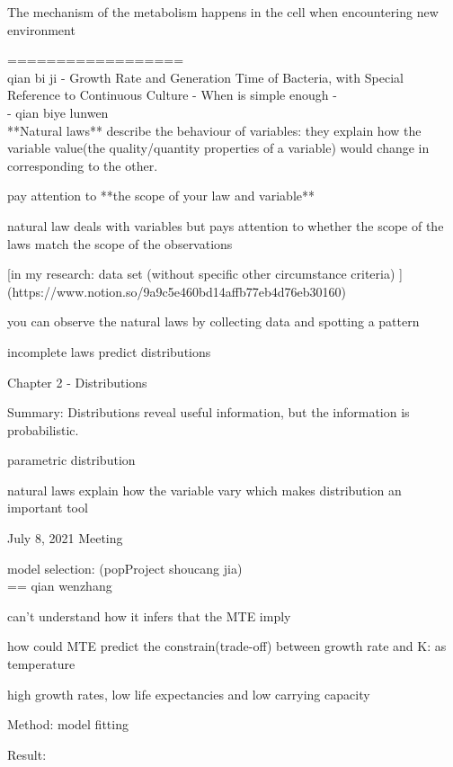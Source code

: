 The mechanism of the metabolism happens in the cell when encountering new environment \citep{shimizu2013metabolic}























==================\\ qian bi ji
- Growth Rate and Generation Time of Bacteria, with Special Reference to Continuous Culture
- When is simple enough
- \\



- qian biye lunwen\\



**Natural laws** describe the behaviour of variables: they explain how the variable value(the quality/quantity properties of a variable) would change in corresponding to the other.

pay attention to **the scope of your law and variable** 

natural law deals with variables but pays attention to whether the scope of the laws match the scope of the observations

[in my research: data set (without specific other circumstance criteria) ](https://www.notion.so/9a9c5e460bd14affb77eb4d76eb30160)

you can observe the natural laws by collecting data and spotting a pattern

incomplete laws predict distributions

Chapter 2 - Distributions

Summary: Distributions reveal useful information, but the information is probabilistic.

parametric distribution

natural laws explain how the variable vary which makes distribution an important tool

July 8, 2021 Meeting

model selection: (popProject shoucang jia)\\
== qian wenzhang

can't understand how it infers that the MTE imply 

how could MTE predict the constrain(trade-off) between growth rate and K: as temperature

high growth rates, low life expectancies and low carrying capacity

Method: model fitting

Result:
